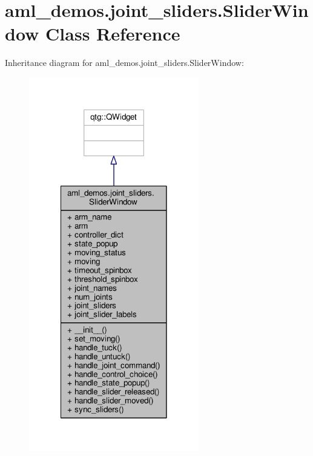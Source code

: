 \hypertarget{classaml__demos_1_1joint__sliders_1_1_slider_window}{\section{aml\-\_\-demos.\-joint\-\_\-sliders.\-Slider\-Window Class Reference}
\label{classaml__demos_1_1joint__sliders_1_1_slider_window}
}


Inheritance diagram for aml\-\_\-demos.\-joint\-\_\-sliders.\-Slider\-Window\-:
\nopagebreak
\begin{figure}[H]
\begin{center}
\leavevmode
\includegraphics[width=210pt]{classaml__demos_1_1joint__sliders_1_1_slider_window__inherit__graph}
\end{center}
\end{figure}


